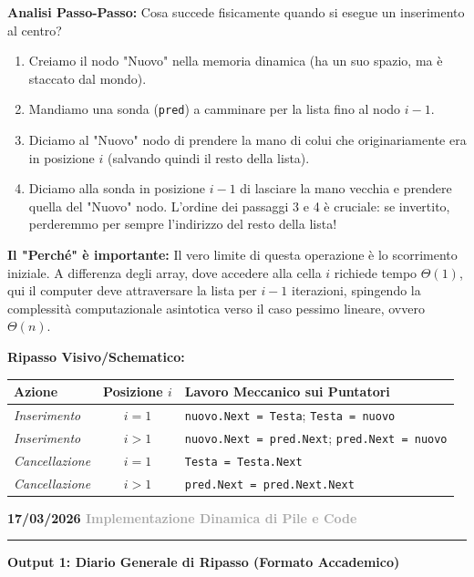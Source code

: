 \documentclass[a4paper, 11pt]{report}
\newcommand{\lezione}[2]{
\vspace{2em}
\noindent\textbf{\Large #1 \hfill \textcolor{darkgray}{#2}}
\vspace{0.5em}
\hrule
\vspace{1.5em}
}
\begin{document}
\textbf{Analisi Passo-Passo:}
Cosa succede fisicamente quando si esegue un inserimento al centro?
\begin{enumerate}
\item Creiamo il nodo "Nuovo" nella memoria dinamica (ha un suo spazio, ma è staccato dal mondo).
\item Mandiamo una sonda (\texttt{pred}) a camminare per la lista fino al nodo $i-1$.
\item Diciamo al "Nuovo" nodo di prendere la mano di colui che originariamente era in posizione $i$ (salvando quindi il resto della lista).
\item Diciamo alla sonda in posizione $i-1$ di lasciare la mano vecchia e prendere quella del "Nuovo" nodo.
L'ordine dei passaggi 3 e 4 è cruciale: se invertito, perderemmo per sempre l'indirizzo del resto della lista!
\end{enumerate}

\textbf{Il "Perché" è importante:}
Il vero limite di questa operazione è lo scorrimento iniziale. A differenza degli array, dove accedere alla cella $i$ richiede tempo $\Theta(1)$, qui il computer deve attraversare la lista per $i-1$ iterazioni, spingendo la complessità computazionale asintotica verso il caso pessimo lineare, ovvero $\Theta(n)$.

\textbf{Ripasso Visivo/Schematico:}
\begin{center}
\begin{tabular}{|l|c|p{6cm}|}
\hline
\textbf{Azione} & \textbf{Posizione $i$} & \textbf{Lavoro Meccanico sui Puntatori} \\
\hline
\textit{Inserimento} & $i=1$ & \texttt{nuovo.Next = Testa}; \texttt{Testa = nuovo} \\
\textit{Inserimento} & $i>1$ & \texttt{nuovo.Next = pred.Next}; \texttt{pred.Next = nuovo} \\
\hline
\textit{Cancellazione} & $i=1$ & \texttt{Testa = Testa.Next} \\
\textit{Cancellazione} & $i>1$ & \texttt{pred.Next = pred.Next.Next} \\
\hline
\end{tabular}
\end{center}


\lezione{17/03/2026}{Implementazione Dinamica di Pile e Code}

\vspace{0.5cm}
\textbf{Output 1: Diario Generale di Ripasso (Formato Accademico)}
\end{document}
